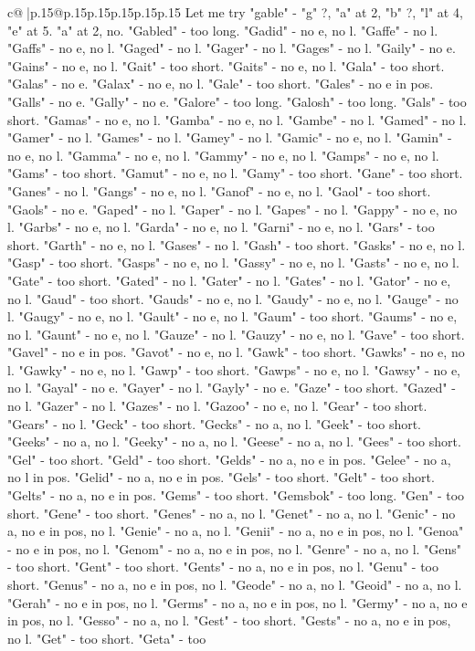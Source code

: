 \documentclass{article}
\begin{document}
{\begin{supertabular}{c@{$\;$}|p{.15\linewidth}@{}p{.15\linewidth}p{.15\linewidth}p{.15\linewidth}p{.15\linewidth}p{.15\linewidth}}
{{{Let me try "gable" {-} "g" ?, "a" at 2, "b" ?, "l" at 4, "e" at 5. "a" at 2, no. "Gabled" {-} too long. "Gadid" {-} no e, no l. "Gaffe" {-} no l. "Gaffs" {-} no e, no l. "Gaged" {-} no l. "Gager" {-} no l. "Gages" {-} no l. "Gaily" {-} no e. "Gains" {-} no e, no l. "Gait" {-} too short. "Gaits" {-} no e, no l. "Gala" {-} too short. "Galas" {-} no e. "Galax" {-} no e, no l. "Gale" {-} too short. "Gales" {-} no e in pos. "Galls" {-} no e. "Gally" {-} no e. "Galore" {-} too long. "Galosh" {-} too long. "Gals" {-} too short. "Gamas" {-} no e, no l. "Gamba" {-} no e, no l. "Gambe" {-} no l. "Gamed" {-} no l. "Gamer" {-} no l. "Games" {-} no l. "Gamey" {-} no l. "Gamic" {-} no e, no l. "Gamin" {-} no e, no l. "Gamma" {-} no e, no l. "Gammy" {-} no e, no l. "Gamps" {-} no e, no l. "Gams" {-} too short. "Gamut" {-} no e, no l. "Gamy" {-} too short. "Gane" {-} too short. "Ganes" {-} no l. "Gangs" {-} no e, no l. "Ganof" {-} no e, no l. "Gaol" {-} too short. "Gaols" {-} no e. "Gaped" {-} no l. "Gaper" {-} no l. "Gapes" {-} no l. "Gappy" {-} no e, no l. "Garbs" {-} no e, no l. "Garda" {-} no e, no l. "Garni" {-} no e, no l. "Gars" {-} too short. "Garth" {-} no e, no l. "Gases" {-} no l. "Gash" {-} too short. "Gasks" {-} no e, no l. "Gasp" {-} too short. "Gasps" {-} no e, no l. "Gassy" {-} no e, no l. "Gasts" {-} no e, no l. "Gate" {-} too short. "Gated" {-} no l. "Gater" {-} no l. "Gates" {-} no l. "Gator" {-} no e, no l. "Gaud" {-} too short. "Gauds" {-} no e, no l. "Gaudy" {-} no e, no l. "Gauge" {-} no l. "Gaugy" {-} no e, no l. "Gault" {-} no e, no l. "Gaum" {-} too short. "Gaums" {-} no e, no l. "Gaunt" {-} no e, no l. "Gauze" {-} no l. "Gauzy" {-} no e, no l. "Gave" {-} too short. "Gavel" {-} no e in pos. "Gavot" {-} no e, no l. "Gawk" {-} too short. "Gawks" {-} no e, no l. "Gawky" {-} no e, no l. "Gawp" {-} too short. "Gawps" {-} no e, no l. "Gawsy" {-} no e, no l. "Gayal" {-} no e. "Gayer" {-} no l. "Gayly" {-} no e. "Gaze" {-} too short. "Gazed" {-} no l. "Gazer" {-} no l. "Gazes" {-} no l. "Gazoo" {-} no e, no l. "Gear" {-} too short. "Gears" {-} no l. "Geck" {-} too short. "Gecks" {-} no a, no l. "Geek" {-} too short. "Geeks" {-} no a, no l. "Geeky" {-} no a, no l. "Geese" {-} no a, no l. "Gees" {-} too short. "Gel" {-} too short. "Geld" {-} too short. "Gelds" {-} no a, no e in pos. "Gelee" {-} no a, no l in pos. "Gelid" {-} no a, no e in pos. "Gels" {-} too short. "Gelt" {-} too short. "Gelts" {-} no a, no e in pos. "Gems" {-} too short. "Gemsbok" {-} too long. "Gen" {-} too short. "Gene" {-} too short. "Genes" {-} no a, no l. "Genet" {-} no a, no l. "Genic" {-} no a, no e in pos, no l. "Genie" {-} no a, no l. "Genii" {-} no a, no e in pos, no l. "Genoa" {-} no e in pos, no l. "Genom" {-} no a, no e in pos, no l. "Genre" {-} no a, no l. "Gens" {-} too short. "Gent" {-} too short. "Gents" {-} no a, no e in pos, no l. "Genu" {-} too short. "Genus" {-} no a, no e in pos, no l. "Geode" {-} no a, no l. "Geoid" {-} no a, no l. "Gerah" {-} no e in pos, no l. "Germs" {-} no a, no e in pos, no l. "Germy" {-} no a, no e in pos, no l. "Gesso" {-} no a, no l. "Gest" {-} too short. "Gests" {-} no a, no e in pos, no l. "Get" {-} too short. "Geta" {-} too }}}
\end{supertabular}}
\end{document}
